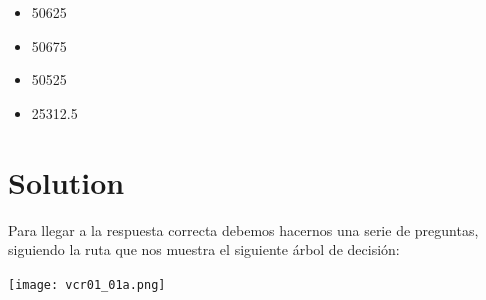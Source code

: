 \documentclass[
]{article}
\providecommand{\tightlist}{%
  \setlength{\itemsep}{0pt}\setlength{\parskip}{0pt}}
\begin{document}
\begin{itemize}
\tightlist
\item
  50625
\item
  50675
\item
  50525
\item
  25312.5
\end{itemize}

\hypertarget{solution}{%
\section{Solution}\label{solution}}

\hfill\break
Para llegar a la respuesta correcta debemos hacernos una serie de
preguntas, siguiendo la ruta que nos muestra el siguiente árbol de
decisión:

\hfill\break
\texttt{[image: vcr01\_01a.png]}
\end{document}
